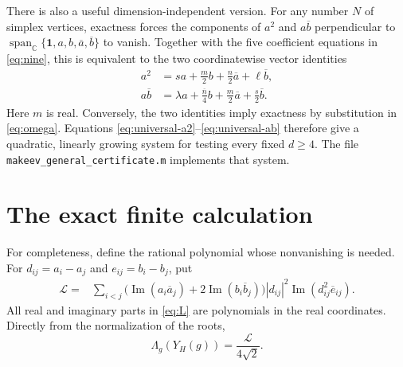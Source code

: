 \documentclass[11pt,reqno]{amsart}
\theoremstyle{remark}
\newcommand{\C}{\mathbb C}
\newcommand{\one}{\mathbf 1}
\newcommand{\abs}[1]{\left\lvert #1\right\rvert}
\begin{document}
There is also a useful dimension-independent version.  For any number $N$ of
simplex vertices, exactness forces the components of $a^2$ and
$a\overline b$ perpendicular to
$\operatorname{span}_{\C}\{\one,a,b,\overline a,\overline b\}$ to vanish.
Together with the five coefficient equations in
\eqref{eq:nine}, this is equivalent to the two coordinatewise vector
identities
\begin{align}
 a^2&=sa+\frac m2b+\frac n2\overline a+\ell\overline b,
 \label{eq:universal-a2}\\
 a\overline b&=\lambda a+\frac{\overline n}{4}b
 +\frac m2\overline a+\frac s2\overline b.
 \label{eq:universal-ab}
\end{align}
Here $m$ is real.  Conversely, the two identities imply exactness by
substitution in \eqref{eq:omega}.  Equations
\eqref{eq:universal-a2}--\eqref{eq:universal-ab} therefore give a
quadratic, linearly growing system for testing every fixed $d\ge4$.  The file
\texttt{makeev\_general\_certificate.m} implements that system.

\section{The exact finite calculation}

For completeness, define the rational polynomial whose nonvanishing is needed.
For $d_{ij}=a_i-a_j$ and $e_{ij}=b_i-b_j$, put
\begin{align}
 \mathcal L={}&\sum_{i<j}
 \bigl(\operatorname{Im}(a_i\overline a_j)
      +2\operatorname{Im}(b_i\overline b_j)\bigr)
 \abs{d_{ij}}^2
 \operatorname{Im}(d_{ij}^2\overline e_{ij}).
 \label{eq:L}
\end{align}
All real and imaginary parts in \eqref{eq:L} are polynomials in the real
coordinates.  Directly from the normalization of the roots,
\begin{equation}\label{eq:Lscale}
 \Lambda_g(Y_H(g))=\frac{\mathcal L}{4\sqrt2}.
\end{equation}
\end{document}
